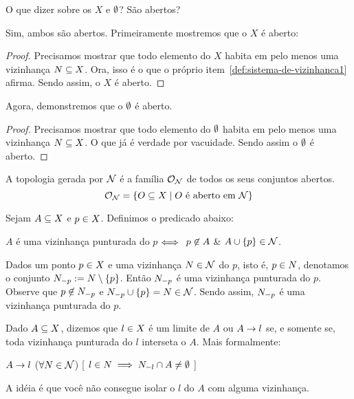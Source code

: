 \documentclass[a4paper,12pt,oneside]{book}
\begin{document}
\begin{question}
	\label{universo-aberto}
	\label{vazio-aberto}
	O que dizer sobre os $X$ e $\emptyset$? São abertos?
\end{question}

\begin{answer}
	Sim, ambos são abertos. Primeiramente mostremos que o $X$ é aberto:
	\begin{proof}
		Precisamos mostrar que todo elemento do $X$ habita em pelo menos uma vizinhança $N \subseteq X$. Ora, isso é o que o próprio item~\ref{def:sistema-de-vizinhanca1} afirma. Sendo assim, o $X$ é aberto.
	\end{proof}
	Agora, demonstremos que o $\emptyset$ é aberto.
	\begin{proof}
		Precisamos mostrar que todo elemento do $\emptyset$ habita em pelo menos uma vizinhança $N \subseteq X$. O que já é verdade por vacuidade. Sendo assim o $\emptyset$ é aberto.
	\end{proof}
\end{answer}

\begin{definition}[Topologia]
	\label{def:topologia}
	A topologia gerada por $\mathcal{N}$ é a família $\mathcal{O}_{\mathcal{N}}$ de todos os seus conjuntos abertos.
	\[
		\mathcal{O}_{\mathcal{N}} = \left\{ O \subseteq X \mid \text{$O$ é aberto em \ensuremath{\mathcal{N}}}\right\}
	\]
\end{definition}

\begin{definition}
	\label{def:vizinhanca-punturada}
	Sejam $A \subseteq X$ e $p \in X$. Definimos o predicado abaixo:
	\begin{center}
		$A$ é uma vizinhança punturada do $p$ $\Longleftrightarrow\;$ $p \not\in A$ \& $A \cup \left\{p\right\} \in \mathcal{N}$.
	\end{center}
	\begin{example}
		Dados um ponto $p \in X$ e uma vizinhança $N \in \mathcal{N}$ do $p$, isto é, $p \in N$, denotamos o conjunto $N_{-p} := N \setminus \left\{p\right\}$. Então $N_{-p}$ é uma vizinhança punturada do $p$. Observe que $p \not\in N_{-p}$ e $N_{-p} \cup \left\{p\right\} = N \in \mathcal{N}$.
		Sendo assim, $N_{-p}$ é uma vizinhança punturada do $p$.
	\end{example}
\end{definition}

\begin{definition}[Limite]
	\label{def:limit-point}
	Dado $A \subseteq X$, dizemos que $l \in X$ é um limite de $A$ ou $A \rightarrow l$ se, e somente se, toda vizinhança punturada do $l$ interseta o $A$. Mais formalmente:
	\begin{center}
		$A \rightarrow l$ \sse
			($\forall N \in \mathcal{N}$)%
			[ $l \in N \implies N_{-l} \cap A \neq \emptyset$ ]
	\end{center}
	A idéia é que você não consegue isolar o $l$ do $A$ com alguma vizinhança.
\end{definition}
\end{document}
